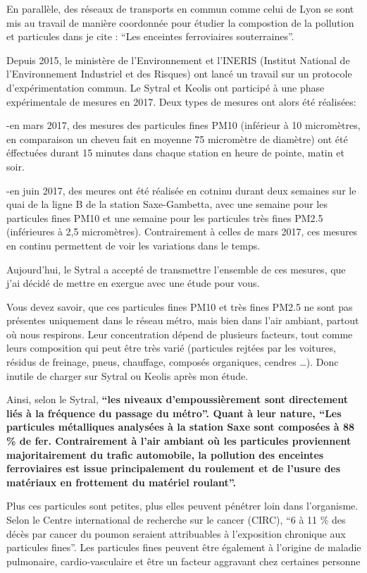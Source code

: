 \documentclass[11pt]{article}
\begin{document}
En parallèle, des réseaux de transports en commun comme celui de Lyon se
sont mis au travail de manière coordonnée pour étudier la compostion de
la pollution et particules dans je cite : ``Les enceintes ferroviaires
souterraines''.

Depuis 2015, le ministère de l'Environnement et l'INERIS (Institut
National de l'Environnement Industriel et des Risques) ont lancé un
travail sur un protocole d'expérimentation commun. Le Sytral et Keolis
ont participé à une phase expérimentale de mesures en 2017. Deux types
de mesures ont alors été réalisées:

-en mars 2017, des mesures des particules fines PM10 (inférieur à 10
micromètres, en comparaison un cheveu fait en moyenne 75 micromètre de
diamètre) ont été éffectuées durant 15 minutes dans chaque station en
heure de pointe, matin et soir.

-en juin 2017, des meures ont été réalisée en cotninu durant deux
semaines sur le quai de la ligne B de la station Saxe-Gambetta, avec une
semaine pour les particules fines PM10 et une semaine pour les
particules très fines PM2.5 (inférieures à 2,5 micromètres).
Contrairement à celles de mars 2017, ces mesures en continu permettent
de voir les variations dans le temps.

Aujourd'hui, le Sytral a accepté de transmettre l'ensemble de ces
mesures, que j'ai décidé de mettre en exergue avec une étude pour vous.

Vous devez savoir, que ces particules fines PM10 et très fines PM2.5 ne
sont pas présentes uniquement dans le réseau métro, mais bien dans l'air
ambiant, partout où nous respirons. Leur concentration dépend de
plusieurs facteurs, tout comme leurs composition qui peut être très
varié (particules rejtées par les voitures, résidus de freinage, pneus,
chauffage, composés organiques, cendres \ldots{}). Donc inutile de
charger sur Sytral ou Keolis après mon étude.

Ainsi, selon le Sytral, \textbf{``les niveaux d'empoussièrement sont
directement liés à la fréquence du passage du métro''. Quant à leur
nature, ``Les particules métalliques analysées à la station Saxe sont
composées à 88 \% de fer. Contrairement à l'air ambiant où les
particules proviennent majoritairement du trafic automobile, la
pollution des enceintes ferroviaires est issue principalement du
roulement et de l'usure des matériaux en frottement du matériel
roulant''.}

Plus ces particules sont petites, plus elles peuvent pénétrer loin dans
l'organisme. Selon le Centre international de recherche sur le cancer
(CIRC), ``6 à 11 \% des décès par cancer du poumon seraient attribuables
à l'exposition chronique aux particules fines''. Les particules fines
peuvent être également à l'origine de maladie pulmonaire,
cardio-vasculaire et être un facteur aggravant chez certaines personne
\end{document}
